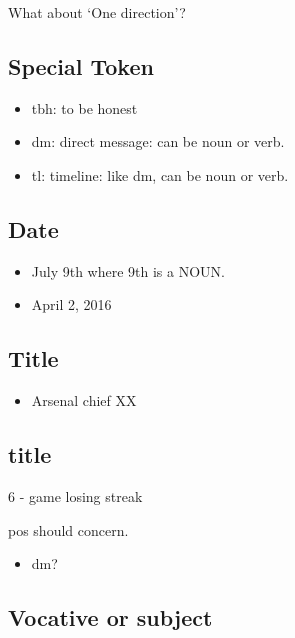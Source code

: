 \documentclass[11pt,a4paper]{article}
\begin{document}
What about `One direction'?


\subsection{Special Token}
\begin{itemize}
	\item tbh: to be honest
	\item dm: direct message: can be noun or verb.
	\item tl: timeline: like dm, can be noun or verb.
\end{itemize}

\subsection{Date}
\begin{itemize}
	\item July 9th where 9th is a NOUN.
	\item April 2, 2016
\end{itemize}

\subsection{Title}
\begin{itemize}
	\item Arsenal chief XX
\end{itemize}

\subsection{title}
6 - game losing streak

pos should concern.
\begin{itemize}
	\item dm?
\end{itemize}

\subsection{Vocative or subject}
\end{document}
